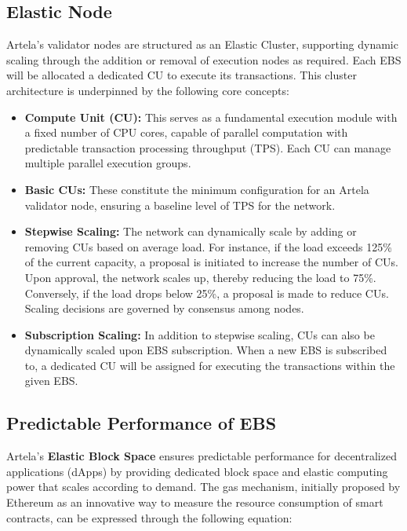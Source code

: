 \subsection{Elastic Node}

Artela's validator nodes are structured as an Elastic Cluster, supporting dynamic scaling through the addition or removal of execution nodes as required. Each EBS will be allocated a dedicated CU to execute its transactions. This cluster architecture is underpinned by the following core concepts:

\begin{itemize}
\item \textbf{Compute Unit (CU):} This serves as a fundamental execution module with a fixed number of CPU cores, capable of parallel computation with predictable transaction processing throughput (TPS). Each CU can manage multiple parallel execution groups.
\item \textbf{Basic CUs:} These constitute the minimum configuration for an Artela validator node, ensuring a baseline level of TPS for the network.
\item \textbf{Stepwise Scaling:} The network can dynamically scale by adding or removing CUs based on average load. For instance, if the load exceeds 125\% of the current capacity, a proposal is initiated to increase the number of CUs. Upon approval, the network scales up, thereby reducing the load to 75\%. Conversely, if the load drops below 25\%, a proposal is made to reduce CUs. Scaling decisions are governed by consensus among nodes.
\item \textbf{Subscription Scaling:} In addition to stepwise scaling, CUs can also be dynamically scaled upon EBS subscription. When a new EBS is subscribed to, a dedicated CU will be assigned for executing the transactions within the given EBS.
\end{itemize}

\subsection{Predictable Performance of EBS}

Artela's \textbf{Elastic Block Space} ensures predictable performance for decentralized applications (dApps) by providing dedicated block space and elastic computing power that scales according to demand. The gas mechanism, initially proposed by Ethereum as an innovative way to measure the resource consumption of smart contracts, can be expressed through the following equation:

